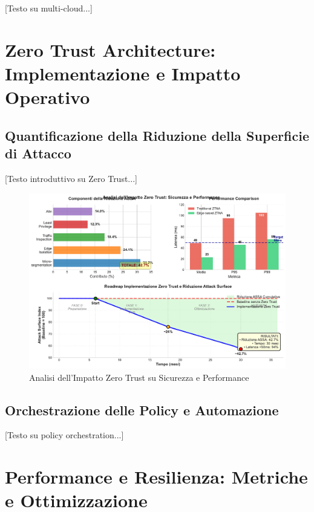 [Testo su multi-cloud...]


\section{Zero Trust Architecture: Implementazione e Impatto Operativo}

\subsection{Quantificazione della Riduzione della Superficie di Attacco}

[Testo introduttivo su Zero Trust...]

\begin{figure}[htbp]
\centering
\includegraphics[width=\textwidth]{figura_3_5_zero_trust.pdf}
\caption{Analisi dell'Impatto Zero Trust su Sicurezza e Performance}
\label{fig:zero_trust_impact}
\end{figure}

\subsection{Orchestrazione delle Policy e Automazione}

[Testo su policy orchestration...]

\section{Performance e Resilienza: Metriche e Ottimizzazione}

